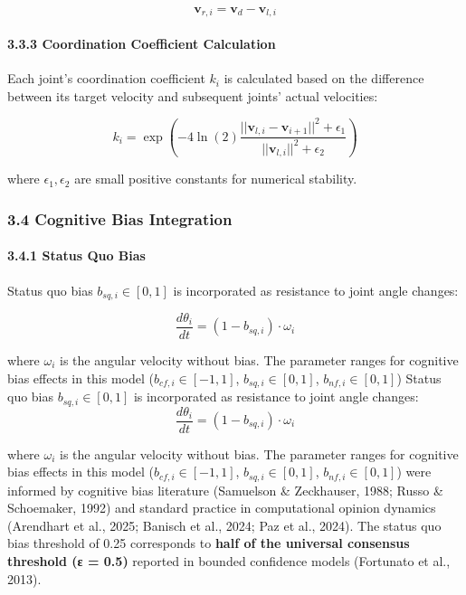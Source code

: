 \[\mathbf{v}_{r,i} = \mathbf{v}_d - \mathbf{v}_{l,i}\]

\paragraph{3.3.3 Coordination Coefficient
Calculation}\label{coordination-coefficient-calculation}

Each joint's coordination coefficient \(k_i\) is calculated based on the
difference between its target velocity and subsequent joints' actual
velocities:

\[k_i = \exp\left(-4\ln(2) \frac{||\mathbf{v}_{l,i} - \mathbf{v}_{i+1}||^2 + \epsilon_1}{||\mathbf{v}_{l,i}||^2 + \epsilon_2}\right)\]

where \(\epsilon_1, \epsilon_2\) are small positive constants for
numerical stability.

\subsubsection{3.4 Cognitive Bias
Integration}\label{cognitive-bias-integration}

\paragraph{3.4.1 Status Quo Bias}\label{status-quo-bias}

Status quo bias \(b_{sq,i} \in [0,1]\) is incorporated as resistance to
joint angle changes:

\[\frac{d\theta_i}{dt} = (1 - b_{sq,i}) \cdot \omega_i\]

where \(\omega_i\) is the angular velocity without bias. The parameter
ranges for cognitive bias effects in this model
(\(b_{cf,i} \in [-1,1]\), \(b_{sq,i} \in [0,1]\),
\(b_{nf,i} \in [0,1]\)) Status quo bias \(b_{sq,i} \in [0,1]\) is
incorporated as resistance to joint angle changes:
\[\frac{d\theta_i}{dt} = (1 - b_{sq,i}) \cdot \omega_i\]

where \(\omega_i\) is the angular velocity without bias. The parameter
ranges for cognitive bias effects in this model
(\(b_{cf,i} \in [-1,1]\), \(b_{sq,i} \in [0,1]\),
\(b_{nf,i} \in [0,1]\)) were informed by cognitive bias literature
(Samuelson \& Zeckhauser, 1988; Russo \& Schoemaker, 1992) and standard
practice in computational opinion dynamics (Arendhart et al., 2025;
Banisch et al., 2024; Paz et al., 2024). The status quo bias threshold
of 0.25 corresponds to \textbf{half of the universal consensus threshold
(ε = 0.5)} reported in bounded confidence models (Fortunato et al.,
2013).


